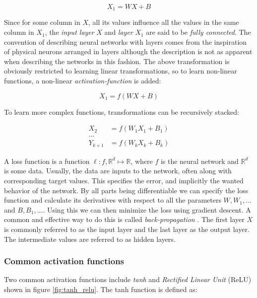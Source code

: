 \begin{equation}
    X_1 = WX + B
\end{equation}

Since for some column in $X$, all its values influence all the values in the
same column in $X_1$, the \textit{input layer} $X$ and \textit{layer} $X_1$ are
said to be \textit{fully connected}. The convention of describing neural
networks with layers comes from the inspiration of physical neurons arranged in
layers although the description is not as apparent when describing the networks
in this fashion. The above transformation is obviously restricted to learning
linear transformations, so to learn non-linear functions, a
non-linear \textit{activation-function} is added:

\begin{equation}
    X_1 = f(WX + B)
\end{equation}

To learn more complex functions, transformations can be recursively stacked:

\begin{align}
    X_2 &= f(W_1X_1 + B_1)\\
    ...\\
    Y_{k+1} &= f(W_kX_k + B_k)
\end{align}

A loss function is a function $\ell : f, \mathbb{R}^d \longmapsto \mathbb{R}$,
where $f$ is the neural network and $\mathbb{R}^d$ is some data. Usually, the
data are inputs to the network, often along with corresponding target values.
This specifies the error, and implicitly the wanted behavior of the network. By
all parts being differentiable we can specify the loss function and calculate
its derivatives with respect to all the parameters $W, W_1,...$ and $B, B_1,
...$.  Using this we can then minimize the loss using gradient descent. A
common and effective way to do this is called \textit{back-propagation}
\cite{williams1986learning}.  The first layer $X$ is commonly referred to as
the input layer and the last layer as the output layer. The intermediate values are
referred to as hidden layers.

\subsubsection{Common activation functions}

Two common activation functions include \textit{tanh} and \textit{Rectified
Linear Unit} (ReLU) \cite{jarrett2009best} shown in figure \ref{fig:tanh_relu}. The tanh function is defined as:

